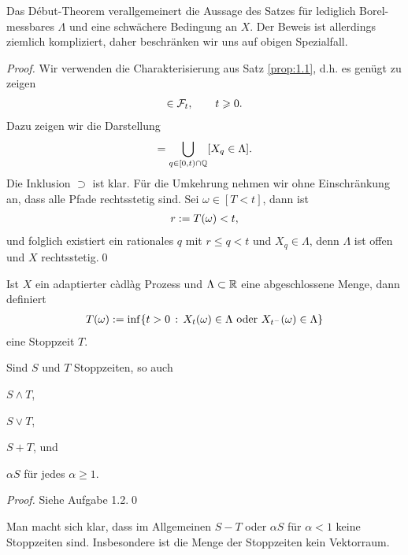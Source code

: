 Das Début-Theorem verallgemeinert die Aussage des Satzes für lediglich
Borel-messbares $\Lambda$ und eine schwächere Bedingung an $X$. Der
Beweis ist allerdings ziemlich kompliziert, daher beschränken wir uns auf obigen
Spezialfall.

\begin{proof}
Wir verwenden die Charakterisierung aus Satz \ref{prop:1.1}, d.h. es genügt zu
zeigen
\begin{align*}
[T<t] \in\FF_t,\qquad t\ge 0.
\end{align*}
Dazu zeigen wir die Darstellung
\begin{align*}
[T<t] = \bigcup_{q\in [0,t)\cap \Q} [X_q\in \Lambda].
\end{align*}
Die Inklusion $\supset$ ist klar. Für die Umkehrung nehmen wir ohne
Einschränkung an, dass alle Pfade rechtsstetig sind. Sei $\omega\in [T<t]$, dann
ist
\begin{align*}
r:= T(\omega) < t,
\end{align*}
und folglich existiert ein rationales $q$ mit $r\le q < t$ und $X_q\in
\Lambda$, denn $\Lambda$ ist offen und $X$ rechtsstetig.\qed
\end{proof}

\begin{prop}
\label{prop:1.4}
Ist $X$ ein adaptierter càdlàg Prozess und $\Lambda\subset\mathbb{R}$ eine
abgeschlossene Menge, dann definiert
\begin{align*}
T(\omega) \defl \inf\setdef{t > 0}{X_t(\omega)\in \Lambda\text{ oder
}X_{t^-}(\omega)\in\Lambda}
\end{align*}
eine Stoppzeit $T$.\fish
\end{prop}


\begin{prop}
\label{prop:1.5}
Sind $S$ und $T$ Stoppzeiten, so auch
\begin{propenum}
\item $S\wedge T$,
\item $S\lor T$,
\item $S+T$, und
\item $\alpha S$ für jedes $\alpha \ge 1$.\fish
\end{propenum}
\end{prop}

\begin{proof}
Siehe Aufgabe 1.2.\qed
\end{proof}

Man macht sich klar, dass im Allgemeinen $S-T$ oder $\alpha S$ für $\alpha < 1$
keine Stoppzeiten sind. Insbesondere ist die Menge der Stoppzeiten kein
Vektorraum.

